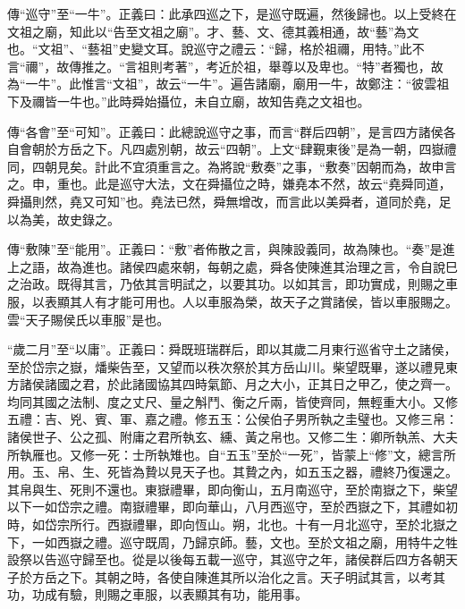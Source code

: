 {\noindent\zhuan{}\fzbyks 傳“巡守”至“一牛”。正義曰：此承四巡之下，是巡守既遍，然後歸也。以上受終在文祖之廟，知此以“告至文祖之廟”。才、藝、文、德其義相通，故“藝”為文也。“文祖”、“藝祖”史變文耳。說巡守之禮云：“歸，格於祖禰，用特。”此不言“禰”，故傳推之。“言祖則考著”，考近於祖，舉尊以及卑也。“特”者獨也，故為“一牛”。此惟言“文祖”，故云“一牛”。遍告諸廟，廟用一牛，故鄭注：“彼雲祖下及禰皆一牛也。”此時舜始攝位，未自立廟，故知告堯之文祖也。 \par}

{\noindent\zhuan{}\fzbyks 傳“各會”至“可知”。正義曰：此總說巡守之事，而言“群后四朝”，是言四方諸侯各自會朝於方岳之下。凡四處別朝，故云“四朝”。上文“肆覲東後”是為一朝，四嶽禮同，四朝見矣。計此不宜須重言之。為將說“敷奏”之事，“敷奏”因朝而為，故申言之。申，重也。此是巡守大法，文在舜攝位之時，嫌堯本不然，故云“堯舜同道，舜攝則然，堯又可知”也。堯法已然，舜無增改，而言此以美舜者，道同於堯，足以為美，故史錄之。 \par}

{\noindent\zhuan{}\fzbyks 傳“敷陳”至“能用”。正義曰：“敷”者佈散之言，與陳設義同，故為陳也。“奏”是進上之語，故為進也。諸侯四處來朝，每朝之處，舜各使陳進其治理之言，令自說巳之治政。既得其言，乃依其言明試之，以要其功。以如其言，即功實成，則賜之車服，以表顯其人有才能可用也。人以車服為榮，故天子之賞諸侯，皆以車服賜之。雲“天子賜侯氏以車服”是也。 \par}

{\noindent\shu{}\fzkt “歲二月”至“以庸”。正義曰：舜既班瑞群后，即以其歲二月東行巡省守土之諸侯，至於岱宗之嶽，燔柴告至，又望而以秩次祭於其方岳山川。柴望既畢，遂以禮見東方諸侯諸國之君，於此諸國協其四時氣節、月之大小，正其日之甲乙，使之齊一。均同其國之法制、度之丈尺、量之斛鬥、衡之斤兩，皆使齊同，無輕重大小。又修五禮：吉、兇、賓、軍、嘉之禮。修五玉：公侯伯子男所執之圭璧也。又修三帛：諸侯世子、公之孤、附庸之君所執玄、纁、黃之帛也。又修二生：卿所執羔、大夫所執雁也。又修一死：士所執雉也。自“五玉”至於“一死”，皆蒙上“修”文，總言所用。玉、帛、生、死皆為贄以見天子也。其贄之內，如五玉之器，禮終乃復還之。其帛與生、死則不還也。東嶽禮畢，即向衡山，五月南巡守，至於南嶽之下，柴望以下一如岱宗之禮。南嶽禮畢，即向華山，八月西巡守，至於西嶽之下，其禮如初時，如岱宗所行。西嶽禮畢，即向恆山。朔，北也。十有一月北巡守，至於北嶽之下，一如西嶽之禮。巡守既周，乃歸京師。藝，文也。至於文祖之廟，用特牛之牲設祭以告巡守歸至也。從是以後每五載一巡守，其巡守之年，諸侯群后四方各朝天子於方岳之下。其朝之時，各使自陳進其所以治化之言。天子明試其言，以考其功，功成有驗，則賜之車服，以表顯其有功，能用事。 \par}

